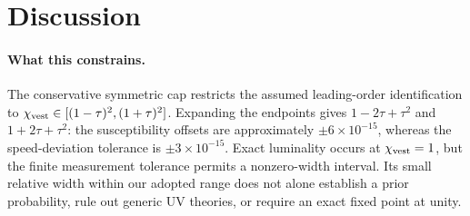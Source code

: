 \documentclass[aps,prl,reprint,nofootinbib,superscriptaddress]{revtex4-2}
\newcommand{\chivest}{\chi_{\rm vest}}
\begin{document}
\section{Discussion}
\label{sec:discussion}

\paragraph{What this constrains.} The conservative symmetric cap
restricts the assumed leading-order identification to
$\chivest\in[(1-\tau)^2,(1+\tau)^2]$.
Expanding the endpoints gives $1-2\tau+\tau^2$ and
$1+2\tau+\tau^2$: the susceptibility offsets are approximately
$\pm6\times10^{-15}$, whereas the speed-deviation tolerance is
$\pm3\times10^{-15}$. Exact luminality occurs at $\chivest=1$,
but the finite measurement tolerance permits a nonzero-width
interval. Its small relative width within our adopted range does not
alone establish a prior probability, rule out generic UV theories,
or require an exact fixed point at unity.
\end{document}
